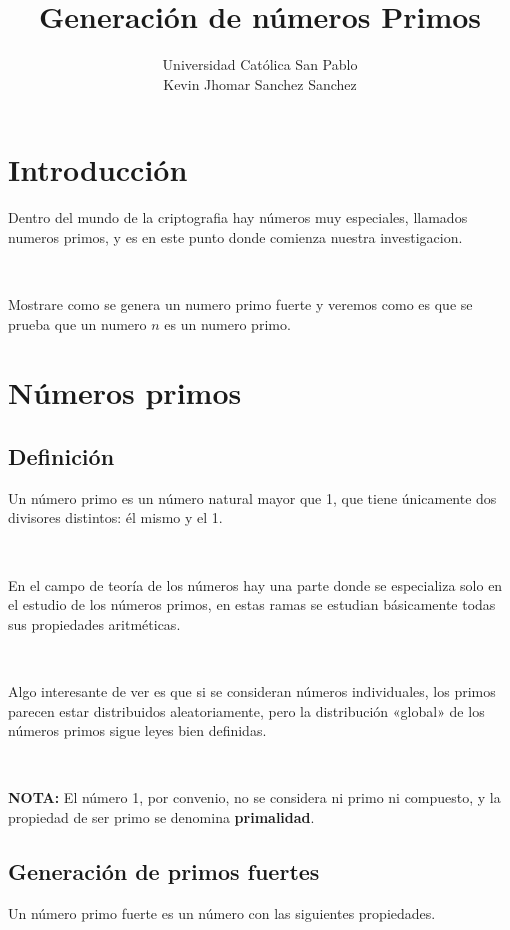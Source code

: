 \documentclass[11pt, conference]{IEEEtran}
\begin{document}
	\title{\bf Generación de números Primos}
	\author{Universidad Católica San Pablo \\ Kevin Jhomar Sanchez Sanchez}
\onecolumn
\maketitle

\bigskip\bigskip\bigskip\bigskip
\bigskip\bigskip\bigskip\bigskip

\tableofcontents 
\twocolumn
\pagebreak
\section{Introducción}
Dentro del mundo de la criptografia hay números muy especiales, llamados numeros primos, y es en este punto donde comienza nuestra investigacion. 

\

Mostrare como se genera un numero primo fuerte y veremos como es que se prueba que un numero $n$ es un numero primo.

\section{Números primos}
\subsection{Definición}
Un número primo es un número natural mayor que 1, que tiene únicamente dos divisores distintos: él mismo y el 1. 

\

En el campo de teoría de los números hay una parte donde se especializa solo en el estudio de los números primos, en estas ramas se estudian básicamente todas sus propiedades aritméticas.

\

Algo interesante de ver es que si se consideran números individuales, los primos parecen estar distribuidos aleatoriamente, pero la distribución «global» de los números primos sigue leyes bien definidas.

\

\textbf{NOTA:} El número 1, por convenio, no se considera ni primo ni compuesto, y la propiedad de ser primo se denomina \textbf{primalidad}.
\subsection{Generación de primos fuertes}
Un número primo fuerte es un número con las siguientes propiedades.
\end{document}
